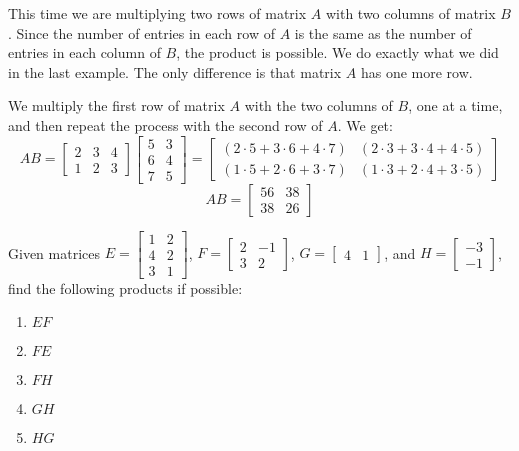 \begin{solution}
    This time we are multiplying two rows of matrix $A$ with two columns of matrix $B$. Since the number of entries in each row of $A$ is the same as the number of entries in each column of $B$, the product is possible. We do exactly what we did in the last example. The only difference is that matrix $A$ has one more row.

    We multiply the first row of matrix $A$ with the two columns of $B$, one at a time, and then repeat the process with the second row of $A$. We get:
    \[
        AB = \begin{bmatrix} 2 & 3 & 4 \\ 1 & 2 & 3 \end{bmatrix} \begin{bmatrix} 5 & 3 \\ 6 & 4 \\ 7 & 5 \end{bmatrix} = \begin{bmatrix} (2 \cdot 5 + 3 \cdot 6 + 4 \cdot 7) & (2 \cdot 3 + 3 \cdot 4 + 4 \cdot 5) \\ (1 \cdot 5 + 2 \cdot 6 + 3 \cdot 7) & (1 \cdot 3 + 2 \cdot 4 + 3 \cdot 5) \end{bmatrix}
    \]
    \[
        AB = \begin{bmatrix} 56 & 38 \\ 38 & 26 \end{bmatrix}
    \]
\end{solution}

\begin{example}
    Given matrices $E = \begin{bmatrix} 1 & 2 \\ 4 & 2 \\ 3 & 1 \end{bmatrix}$, $F = \begin{bmatrix} 2 & -1 \\ 3 & 2 \end{bmatrix}$, $G = \begin{bmatrix} 4 & 1 \end{bmatrix}$, and $H = \begin{bmatrix} -3 \\ -1 \end{bmatrix}$, find the following products if possible:

    \begin{enumerate}
        \item $EF$
        \item $FE$
        \item $FH$
        \item $GH$
        \item $HG$
    \end{enumerate}

\end{example}

